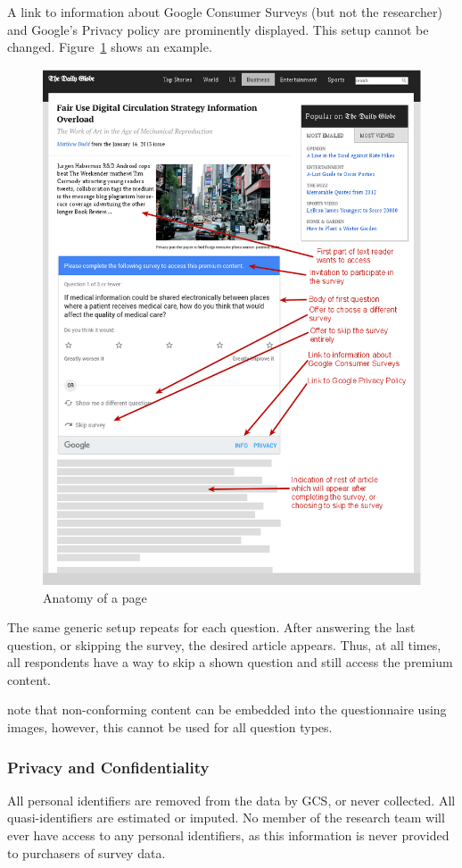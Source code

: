 A link to information about Google Consumer Surveys (but not the researcher) and Google's Privacy policy are prominently displayed. This setup cannot be changed. Figure~\ref{fig:anatomy} shows an example. 
\begin{figure}
	\includegraphics[width=\textwidth]{Selection_359.png}
	\caption{\label{fig:anatomy}Anatomy of a page}
\end{figure}
The same generic setup repeats for each question. After answering the last question, or skipping the survey, the desired article appears. Thus, at all times, all respondents have a way to skip a shown question and still access the premium content.

\cite{doi:10.1093/pan/mpw016} note that non-conforming content can be embedded into the questionnaire using images, however, this cannot be used for all question types.

\subsubsection{Privacy and Confidentiality}
All personal identifiers are removed from the data by \ac{GCS}, or never collected. All quasi-identifiers are estimated or imputed. No member of the research team will ever have access to any personal identifiers, as this information is never provided to purchasers of survey data. 